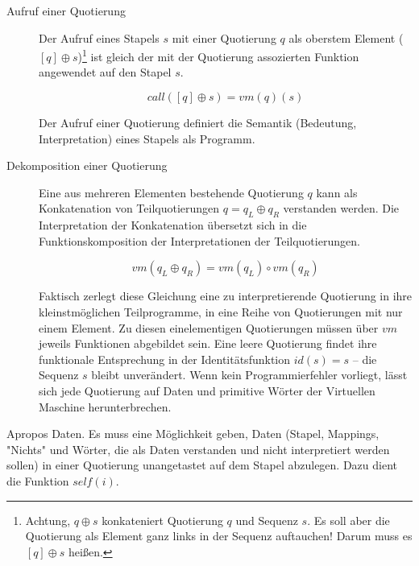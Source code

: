 \begin{description}
\item[Aufruf einer Quotierung] Der Aufruf eines Stapels $s$ mit einer Quotierung $q$ als oberstem Element ($[q]\oplus s$)\footnote{Achtung, $q\oplus s$ konkateniert Quotierung $q$ und Sequenz $s$. Es soll aber die Quotierung als Element ganz links in der Sequenz auftauchen! Darum muss es $[q]\oplus s$ heißen.} ist gleich der mit der Quotierung assozierten Funktion angewendet auf den Stapel $s$.

\begin{equation}
call([q]\oplus s) = vm(q)(s)
\end{equation}

Der Aufruf einer Quotierung definiert die Semantik (Bedeutung, Interpretation) eines Stapels als Programm.

\item[Dekomposition einer Quotierung] Eine aus mehreren Elementen bestehende Quotierung $q$ kann als Konkatenation von Teilquotierungen $q=q_L\oplus q_R$ verstanden werden. Die Interpretation der Konkatenation übersetzt sich in die Funktionskomposition der Interpretationen der Teilquotierungen.

\begin{equation}
vm(q_L\oplus q_R) = vm(q_L) \circ vm(q_R)
\end{equation}

Faktisch zerlegt diese Gleichung eine zu interpretierende Quotierung in ihre kleinstmöglichen Teilprogramme, in eine Reihe von Quotierungen mit nur einem Element. Zu diesen einelementigen Quotierungen müssen über $vm$ jeweils Funktionen abgebildet sein. Eine leere Quotierung findet ihre funktionale Entsprechung in der Identitätsfunktion $id(s)=s$ -- die Sequenz $s$ bleibt unverändert. Wenn kein Programmierfehler vorliegt, lässt sich jede Quotierung auf Daten und primitive Wörter der Virtuellen Maschine herunterbrechen.
\end{description}


Apropos Daten. Es muss eine Möglichkeit geben, Daten (Stapel, Mappings, "Nichts" und Wörter, die als Daten verstanden und nicht interpretiert werden sollen) in einer Quotierung unangetastet auf dem Stapel abzulegen. Dazu dient die Funktion $self(i)$.

